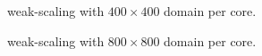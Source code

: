 \begin{figure}[!h]\begin{center}
  \caption{weak-scaling with $400 \times 400$ domain per core.}
  \label{fig:weak1}
\end{center}\end{figure}
\begin{figure}[!h]\begin{center}
  \caption{weak-scaling with $800 \times 800$ domain per core.}
  \label{fig:weak2}
\end{center}\end{figure}

